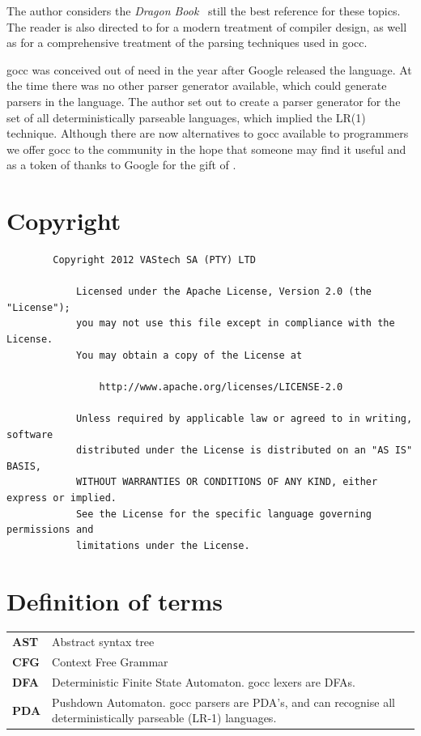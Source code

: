 \documentclass[12pt]{article}
\begin{document}
	The author  considers the {\em Dragon Book}~\cite{Dragon Book} still the best reference for these topics. The reader is also directed to \cite{Modern Compiler Design} for a modern treatment of compiler design, as well as \cite{Parsing} for a comprehensive treatment of the parsing techniques used in gocc.

	gocc was conceived out of need in the year after Google released the \Go language. At the time there was no other parser generator available, which could generate parsers in the \Go language. The author set out to create a parser generator for the set of all deterministically parseable languages, which implied the LR(1) technique. Although there are now alternatives to gocc available to \Go programmers we offer gocc to the community in the hope that someone may find it useful and as a token of thanks to Google for the gift of \Go.

\section{Copyright}
	\begin{verbatim}
		Copyright 2012 VAStech SA (PTY) LTD

		    Licensed under the Apache License, Version 2.0 (the "License");
		    you may not use this file except in compliance with the License.
		    You may obtain a copy of the License at

		        http://www.apache.org/licenses/LICENSE-2.0

		    Unless required by applicable law or agreed to in writing, software
		    distributed under the License is distributed on an "AS IS" BASIS,
		    WITHOUT WARRANTIES OR CONDITIONS OF ANY KIND, either express or implied.
		    See the License for the specific language governing permissions and
		    limitations under the License.
	\end{verbatim}



\section{Definition of terms}
	\begin{longtable}{lp{15cm}}
		\bf AST & Abstract syntax tree\\
		\bf CFG & Context Free Grammar \\
		\bf DFA & Deterministic Finite State Automaton. gocc lexers are DFAs. \\
		\bf PDA & Pushdown Automaton. gocc parsers are PDA's, and can recognise all deterministically parseable (LR-1) languages.\\
	\end{longtable}
\end{document}
